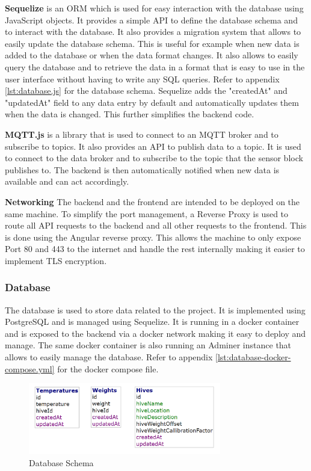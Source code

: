 \textbf{Sequelize} is an \Gls{ORM} which is used for easy interaction with the database using JavaScript objects. It provides a simple API to define the database schema and to interact with the database. It also provides a migration system that allows to easily update the database schema. This is useful for example when new data is added to the database or when the data format changes. It also allows to easily query the database and to retrieve the data in a format that is easy to use in the user interface without having to write any SQL queries. Refer to appendix \ref{lst:database.js} for the database schema.
Sequelize adds the "createdAt" and "updatedAt" field to any data entry by default and automatically updates them when the data is changed. This further simplifies the backend code.

\textbf{MQTT.js} is a library that is used to connect to an MQTT broker and to subscribe to topics. It also provides an API to publish data to a topic. It is used to connect to the data broker and to subscribe to the topic that the sensor block publishes to. The backend is then automatically notified when new data is available and can act accordingly.

\textbf{Networking}
The backend and the frontend are intended to be deployed on the same machine. To simplify the port management, a \gls{Reverse Proxy} is used to route all API requests to the backend and all other requests to the frontend. This is done using the Angular reverse proxy. This allows the machine to only expose \gls{Port} 80 and 443 to the internet and handle the rest internally making it easier to implement TLS encryption.

\subsubsection {Database} \label{sec:database}
The database is used to store data related to the project. It is implemented using PostgreSQL and is managed using Sequelize. It is running in a docker container and is exposed to the backend via a docker network making it easy to deploy and manage. The same docker container is also running an Adminer instance that allows to easily manage the database. Refer to appendix \ref{lst:database-docker-compose.yml} for the docker compose file.

\begin{figure}
    \centering
    \includegraphics[width=0.75\textwidth]{figures/database_shema.png}
    \caption{Database Schema}
    \label{fig:database}
\end{figure}

